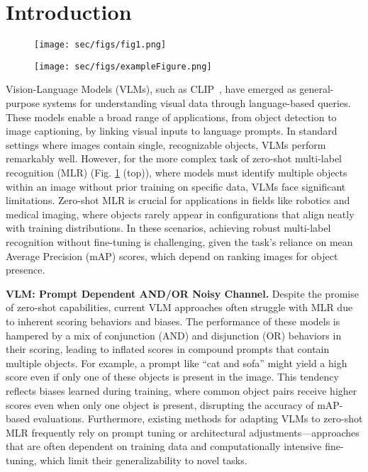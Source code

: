 \vspace{-12pt}
\section{Introduction}
\begin{figure}[t]
  \centering
   \texttt{[image: sec/figs/fig1.png]}
   \caption{\captionMethodFigure}
   \label{fig:methodFigure}
\end{figure}
\begin{figure}[t]
  \centering
   \texttt{[image: sec/figs/exampleFigure.png]}
   \caption{\captionExampleFigure}
   \label{fig:exampleFigure}
   \vspace{-12pt}
\end{figure}
Vision-Language Models (VLMs), such as CLIP~\cite{CLIP}, have emerged as general-purpose systems for understanding visual data through language-based queries. These models enable a broad range of applications, from object detection to image captioning, by linking visual inputs to language prompts. In standard settings where images contain single, recognizable objects, VLMs perform remarkably well. However, for the more complex task of zero-shot multi-label recognition (MLR) (Fig. \ref{fig:methodFigure} (top)), where models must identify multiple objects within an image without prior training on specific data, VLMs face significant limitations. Zero-shot MLR is crucial for applications in fields like robotics and medical imaging, where objects rarely appear in configurations that align neatly with training distributions. In these scenarios, achieving robust multi-label recognition without fine-tuning is challenging, given the task’s reliance on mean Average Precision (mAP) scores, which depend on ranking images for object presence.

\noindent \textbf{VLM: Prompt Dependent AND/OR Noisy Channel.} Despite the promise of zero-shot capabilities, current VLM approaches often struggle with MLR due to inherent scoring behaviors and biases. The performance of these models is hampered by a mix of conjunction (AND) and disjunction (OR) behaviors in their scoring, leading to inflated scores in compound prompts that contain multiple objects. For example, a prompt like “cat and sofa” might yield a high score even if only one of these objects is present in the image. This tendency reflects biases learned during training, where common object pairs receive higher scores even when only one object is present, disrupting the accuracy of mAP-based evaluations. Furthermore, existing methods for adapting VLMs to zero-shot MLR frequently rely on prompt tuning or architectural adjustments—approaches that are often dependent on training data and computationally intensive fine-tuning, which limit their generalizability to novel tasks.

